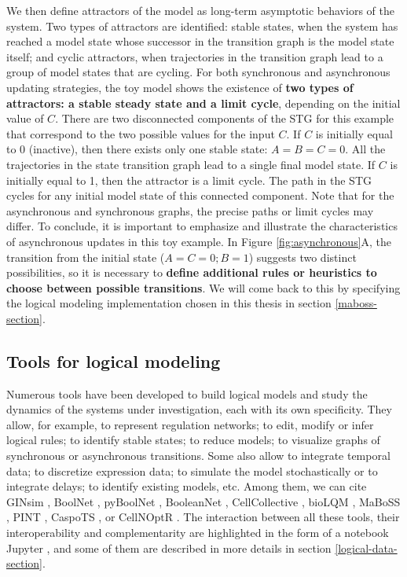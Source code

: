 \documentclass[a4paper,12pt,twoside,onecolumn,openright,final,oldfontcommands]{memoir}
\begin{document}
We then define attractors of the model as long-term asymptotic behaviors
of the system. Two types of attractors are identified: stable states,
when the system has reached a model state whose successor in the
transition graph is the model state itself; and cyclic attractors, when
trajectories in the transition graph lead to a group of model states
that are cycling. For both synchronous and asynchronous updating
strategies, the toy model shows the existence of \textbf{two types of
attractors: a stable steady state and a limit cycle}, depending on the
initial value of \(C\). There are two disconnected components of the STG
for this example that correspond to the two possible values for the
input \(C\). If \(C\) is initially equal to 0 (inactive), then there
exists only one stable state: \(A=B=C=0\). All the trajectories in the
state transition graph lead to a single final model state. If \(C\) is
initially equal to 1, then the attractor is a limit cycle. The path in
the STG cycles for any initial model state of this connected component.
Note that for the asynchronous and synchronous graphs, the precise paths
or limit cycles may differ. To conclude, it is important to emphasize
and illustrate the characteristics of asynchronous updates in this toy
example. In Figure \ref{fig:asynchronous}A, the transition from the
initial state (\(A=C=0;B=1\)) suggests two distinct possibilities, so it
is necessary to \textbf{define additional rules or heuristics to choose
between possible transitions}. We will come back to this by specifying
the logical modeling implementation chosen in this thesis in section
\ref{maboss-section}.

\subsection{Tools for logical
modeling}\label{tools-for-logical-modeling}

Numerous tools have been developed to build logical models and study the
dynamics of the systems under investigation, each with its own
specificity. They allow, for example, to represent regulation networks;
to edit, modify or infer logical rules; to identify stable states; to
reduce models; to visualize graphs of synchronous or asynchronous
transitions. Some also allow to integrate temporal data; to discretize
expression data; to simulate the model stochastically or to integrate
delays; to identify existing models, etc. Among them, we can cite GINsim
\citep{naldi2018logical}, BoolNet \citep{mussel2010boolnet}, pyBoolNet
\citep{klarner2016pyboolnet}, BooleanNet \citep{albert2008boolean},
CellCollective \citep{helikar2012cell}, bioLQM \citep{naldi2018biolqm},
MaBoSS \citep{stoll2012continuous, stoll2017maboss}, PINT \citep{Pint},
CaspoTS \citep{ostrowski2016boolean}, or CellNOptR
\citep{terfve2012cellnoptr}. The interaction between all these tools,
their interoperability and complementarity are highlighted in the form
of a notebook Jupyter \citep{naldi2018colomoto}, and some of them are
described in more details in section \ref{logical-data-section}.
\end{document}
